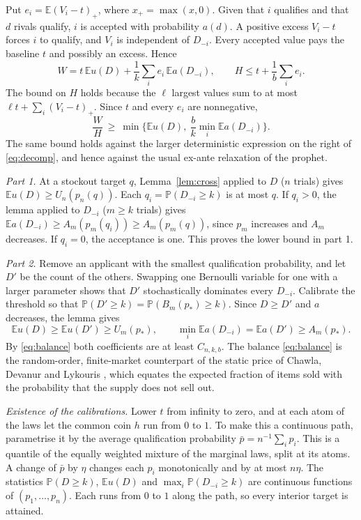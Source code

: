 \documentclass[11pt,a4paper]{article}
\theoremstyle{remark}
\newcommand{\E}{\mathbb E}
\newcommand{\Prob}{\mathbb P}
\begin{document}
Put $e_i=\E(V_i-t)_+$, where $x_+=\max(x,0)$. Given that $i$ qualifies and that $d$ rivals qualify, $i$ is accepted with probability $a(d)$. A positive excess $V_i-t$ forces $i$ to qualify, and $V_i$ is independent of $D_{-i}$. Every accepted value pays the baseline $t$ and possibly an excess. Hence
\begin{equation}\label{eq:decomp}
 W=t\,\E u(D)+\frac1k\sum_i e_i\,\E a(D_{-i}),\qquad H\le t+\frac1b\sum_i e_i .
\end{equation}
The bound on $H$ holds because the $\ell$ largest values sum to at most $\ell t+\sum_i(V_i-t)_+$. Since $t$ and every $e_i$ are nonnegative,
\begin{equation}\label{eq:twocoef}
 \frac WH\ \ge\ \min\Big\{\E u(D),\ \frac bk\min_i\E a(D_{-i})\Big\}.
\end{equation}
The same bound holds against the larger deterministic expression on the right of \eqref{eq:decomp}, and hence against the usual ex-ante relaxation of the prophet.

\emph{Part 1.} At a stockout target $q$, Lemma~\ref{lem:cross} applied to $D$ ($n$ trials) gives $\E u(D)\ge U_n(p_n(q))$. Each $q_i=\Prob(D_{-i}\ge k)$ is at most $q$. If $q_i>0$, the lemma applied to $D_{-i}$ ($m\ge k$ trials) gives $\E a(D_{-i})\ge A_m(p_m(q_i))\ge A_m(p_m(q))$, since $p_m$ increases and $A_m$ decreases. If $q_i=0$, the acceptance is one. This proves the lower bound in part 1.

\emph{Part 2.} Remove an applicant with the smallest qualification probability, and let $D'$ be the count of the others. Swapping one Bernoulli variable for one with a larger parameter shows that $D'$ stochastically dominates every $D_{-i}$. Calibrate the threshold so that $\Prob(D'\ge k)=\Prob(B_m(p_*)\ge k)$. Since $D\ge D'$ and $a$ decreases, the lemma gives
\[
 \E u(D)\ge \E u(D')\ge U_m(p_*),\qquad \min_i\E a(D_{-i})=\E a(D')\ge A_m(p_*).
\]
By \eqref{eq:balance} both coefficients are at least $C_{n,k,b}$. The balance \eqref{eq:balance} is the random-order, finite-market counterpart of the static price of Chawla, Devanur and Lykouris \cite{cdl}, which equates the expected fraction of items sold with the probability that the supply does not sell out.

\emph{Existence of the calibrations.} Lower $t$ from infinity to zero, and at each atom of the laws let the common coin $h$ run from $0$ to $1$. To make this a continuous path, parametrise it by the average qualification probability $\bar p=n^{-1}\sum_ip_i$. This is a quantile of the equally weighted mixture of the marginal laws, split at its atoms. A change of $\bar p$ by $\eta$ changes each $p_i$ monotonically and by at most $n\eta$. The statistics $\Prob(D\ge k)$, $\E u(D)$ and $\max_i\Prob(D_{-i}\ge k)$ are continuous functions of $(p_1,\dots,p_n)$. Each runs from $0$ to $1$ along the path, so every interior target is attained.
\end{document}
